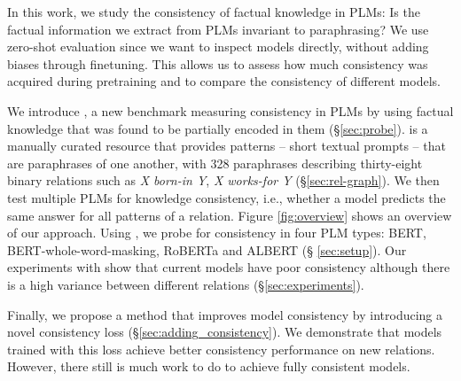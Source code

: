 In this work, we study the consistency of factual knowledge
in PLMs: Is the factual information we extract from PLMs
invariant to paraphrasing? We use zero-shot evaluation since
we want to inspect models directly, without adding biases
through finetuning. This allows us to assess how
much consistency was acquired during pretraining and to
compare the consistency of different models.



We introduce \resource{}, a new benchmark  measuring
consistency in PLMs by using factual knowledge that was found to be partially encoded in them (\S \ref{sec:probe}).
\resource{} is a manually curated resource
that provides patterns -- short textual prompts -- that are paraphrases of one another, with 328 paraphrases describing thirty-eight binary relations such as \textit{X born-in Y}, \textit{X works-for Y} (\S \ref{sec:rel-graph}).
We then test multiple PLMs for knowledge consistency, i.e., whether
a model  predicts the same answer for all patterns of a relation.
Figure \ref{fig:overview} shows an overview of our approach.
Using \resource{}, we probe for consistency in four PLM
types: BERT, BERT-whole-word-masking, RoBERTa and ALBERT (\S
\ref{sec:setup}).
Our experiments with \resource{} show that
current models have poor consistency although there is a high variance between different relations (\S \ref{sec:experiments}). 

Finally, we propose a method that improves model consistency
by introducing a novel consistency loss
(\S \ref{sec:adding_consistency}). We demonstrate that models trained with this
loss achieve better consistency
performance on new relations. However, there still is much
work to do to achieve fully consistent models.



